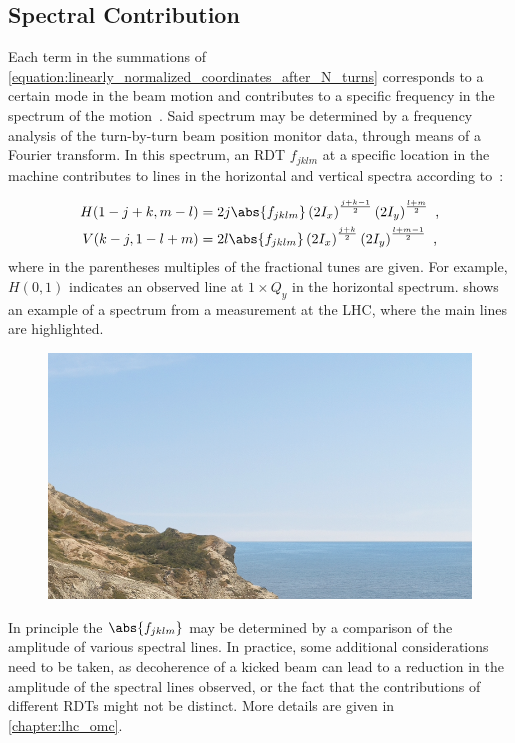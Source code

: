 \subsection{Spectral Contribution}
\label{subsec:spectral_contribution}

Each term in the summations of \cref{equation:linearly_normalized_coordinates_after_N_turns} corresponds to a certain mode in the beam motion and contributes to a specific frequency in the spectrum of the motion~\cite{PHD:Bengtsson}.
Said spectrum may be determined by a frequency analysis of the turn-by-turn beam position monitor data, through means of a Fourier transform.
In this spectrum, an RDT \(f_{jklm}\) at a specific location in the machine contributes to lines in the horizontal and vertical spectra according to~\cite{PHD:Bengtsson,PRAB:Franchi:Emittance_Sharing_Coupling}:

\begin{equation}
    \begin{aligned}
        H(1-j+k, m-l) &= 2 j \abs{f_{jklm}} \left( 2 I_x \right)^{\frac{j+k-1}{2}} \left( 2 I_y \right)^{\frac{l+m}{2}} \text{ ,}\\
        V(k-j, 1-l+m) &= 2 l \abs{f_{jklm}} \left( 2 I_x \right)^{\frac{j+k}{2}} \left( 2 I_y \right)^{\frac{l+m-1}{2}} \text{ ,}
    \end{aligned}
    \label{equation:rdt_contribution_to_spectrum_line}
\end{equation}
where in the parentheses multiples of the fractional tunes are given.
For example, \(H(0,1)\) indicates an observed line at \(1 \times Q_y\) in the horizontal spectrum.
 shows an example of a spectrum from a measurement at the LHC, where the main lines are highlighted.

\begin{figure}[!htb]
    \centering
    \includegraphics[width = 0.3\linewidth]{Figures/placeholder.png}
    \caption{}
    \label{figure:example_spectrum}
\end{figure}

In principle the \(\abs{f_{jklm}}\) may be determined by a comparison of the amplitude of various spectral lines.
In practice, some additional considerations need to be taken, as decoherence of a kicked beam can lead to a reduction in the amplitude of the spectral lines observed, or the fact that the contributions of different RDTs might not be distinct.
More details are given in \cref{chapter:lhc_omc}.

